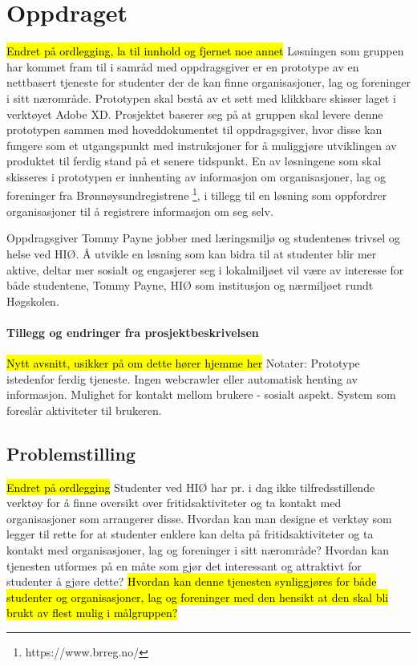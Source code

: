 \section{Oppdraget}
\hl{Endret på ordlegging, la til innhold og fjernet noe annet}
Løsningen som gruppen har kommet fram til i samråd med oppdragsgiver er en prototype av en nettbasert tjeneste for studenter der de kan finne organisasjoner, lag og foreninger i sitt nærområde. Prototypen skal bestå av et sett med klikkbare skisser laget i verktøyet Adobe XD. Prosjektet baserer seg på at gruppen skal levere denne prototypen sammen med hoveddokumentet til oppdragsgiver, hvor disse kan fungere som et utgangspunkt med instruksjoner for å muliggjøre utviklingen av produktet til ferdig stand på et senere tidspunkt. En av løsningene som skal skisseres i prototypen er innhenting av informasjon om organisasjoner, lag og foreninger fra Brønnøysundregistrene \footnote{https://www.brreg.no/}, i tillegg til en løsning som oppfordrer organisasjoner til å registrere informasjon om seg selv.

Oppdragsgiver Tommy Payne jobber med læringsmiljø og studentenes trivsel og helse ved HIØ. Å utvikle en løsning som kan bidra til at studenter blir mer aktive, deltar mer sosialt og engasjerer seg i lokalmiljøet vil være av interesse for både studentene, Tommy Payne, HIØ som institusjon og nærmiljøet rundt Høgskolen.

\paragraph{Tillegg og endringer fra prosjektbeskrivelsen}
\hl{Nytt avsnitt, usikker på om dette hører hjemme her}
Notater:
Prototype istedenfor ferdig tjeneste.
Ingen webcrawler eller automatisk henting av informasjon.
Mulighet for kontakt mellom brukere - sosialt aspekt.
System som foreslår aktiviteter til brukeren.

\subsection{Problemstilling}
\hl{Endret på ordlegging}
Studenter ved HIØ har pr. i dag ikke tilfredsstillende verktøy for å finne oversikt over fritidsaktiviteter og ta kontakt med organisasjoner som arrangerer disse. Hvordan kan man designe et verktøy som legger til rette for at studenter enklere kan delta på fritidsaktiviteter og ta kontakt med organisasjoner, lag og foreninger i sitt nærområde? Hvordan kan tjenesten utformes på en måte som gjør det interessant og attraktivt for studenter å gjøre dette? \hl{Hvordan kan denne tjenesten synliggjøres for både studenter og organisasjoner, lag og foreninger med den hensikt at den skal bli brukt av flest mulig i målgruppen?}

